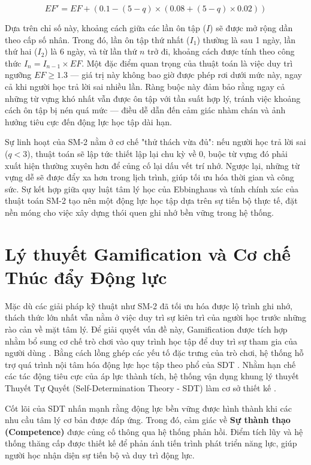 $$EF' = EF + (0.1 - (5 - q) \times (0.08 + (5 - q) \times 0.02))$$

Dựa trên chỉ số này, khoảng cách giữa các lần ôn tập ($I$) sẽ được mở rộng dần theo cấp số nhân. Trong đó, lần ôn tập thứ nhất ($I_1$) thường là sau 1 ngày, lần thứ hai ($I_2$) là 6 ngày, và từ lần thứ $n$ trở đi, khoảng cách được tính theo công thức $I_n = I_{n-1} \times EF$. Một đặc điểm quan trọng của thuật toán là việc duy trì ngưỡng $EF \ge 1.3$ — giá trị này không bao giờ được phép rơi dưới mức này, ngay cả khi người học trả lời sai nhiều lần. Ràng buộc này đảm bảo rằng ngay cả những từ vựng khó nhất vẫn được ôn tập với tần suất hợp lý, tránh việc khoảng cách ôn tập bị nén quá mức — điều dễ dẫn đến cảm giác nhàm chán và ảnh hưởng tiêu cực đến động lực học tập dài hạn.

Sự linh hoạt của SM-2 nằm ở cơ chế "thử thách vừa đủ": nếu người học trả lời sai ($q < 3$), thuật toán sẽ lập tức thiết lập lại chu kỳ về 0, buộc từ vựng đó phải xuất hiện thường xuyên hơn để củng cố lại dấu vết trí nhớ. Ngược lại, những từ vựng dễ sẽ được đẩy xa hơn trong lịch trình, giúp tối ưu hóa thời gian và công sức. Sự kết hợp giữa quy luật tâm lý học của Ebbinghaus và tính chính xác của thuật toán SM-2 tạo nên một động lực học tập dựa trên sự tiến bộ thực tế, đặt nền móng cho việc xây dựng thói quen ghi nhớ bền vững trong hệ thống.


\section{Lý thuyết Gamification và Cơ chế Thúc đẩy Động lực}

Mặc dù các giải pháp kỹ thuật như SM-2 đã tối ưu hóa được lộ trình ghi nhớ, thách thức lớn nhất vẫn nằm ở việc duy trì sự kiên trì của người học trước những rào cản về mặt tâm lý. Để giải quyết vấn đề này, Gamification được tích hợp nhằm bổ sung cơ chế trò chơi vào quy trình học tập để duy trì sự tham gia của người dùng \cite{Deterding2011}. Bằng cách lồng ghép các yếu tố đặc trưng của trò chơi, hệ thống hỗ trợ quá trình nội tâm hóa động lực học tập theo phổ của SDT \cite{Hamari2014}. Nhằm hạn chế các tác động tiêu cực của áp lực thành tích, hệ thống vận dụng khung lý thuyết Thuyết Tự Quyết (Self-Determination Theory - SDT) làm cơ sở thiết kế \cite{RyanDeci2017}.

Cốt lõi của SDT nhấn mạnh rằng động lực bền vững được hình thành khi các nhu cầu tâm lý cơ bản được đáp ứng. Trong đó, cảm giác về \textbf{Sự thành thạo (Competence)} được củng cố thông qua hệ thống phản hồi. Điểm tích lũy và hệ thống thăng cấp được thiết kế để phản ánh tiến trình phát triển năng lực, giúp người học nhận diện sự tiến bộ và duy trì động lực.

